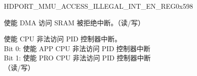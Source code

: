 \begin{register}{H}{DPORT\_MMU\_ACCESS\_ILLEGAL\_INT\_EN\_REG}{0x598}\label{regdesc:MMUACCESSILLEGALINTENAREG}
%
%
%
%
\regnewline%
\begin{regdesc}\begin{reglist}
\item [DPORT\_DMA\_ACCESS\_DENY\_INT\_EN] 使能 DMA 访问 SRAM 被拒绝中断。（读/写）\\
\item [DPORT\_ACCESS\_PID\_ILLEGAL\_INT\_EN] 使能 CPU 非法访问 PID 控制器中断。\\
Bit 0: 使能 APP CPU 非法访问 PID 控制器中断\\
Bit 1: 使能 PRO CPU 非法访问 PID 控制器中断\\
（读/写）
\end{reglist}\end{regdesc}
\end{register}


